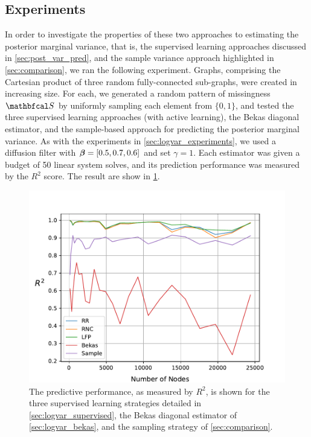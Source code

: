 \subsection{Experiments}

In order to investigate the properties of these two approaches to estimating the posterior marginal variance, that is, the supervised learning approaches discussed in \cref{sec:post_var_pred}, and the sample variance approach highlighted in \cref{sec:comparison}, we ran the following experiment. Graphs, comprising the Cartesian product of three random fully-connected sub-graphs, were created in increasing size. For each, we generated a random pattern of missingness $\St$ by uniformly sampling each element from $\{0, 1\}$, and tested the three supervised learning approaches (with active learning), the Bekas diagonal estimator, and the sample-based approach for predicting the posterior marginal variance. As with the experiments in \cref{sec:logvar_experiments}, we used a diffusion filter with $\boldsymbol{\beta} = [0.5, 0.7, 0.6]$ and set $\gamma=1$. Each estimator was given a budget of 50 linear system solves, and its prediction performance was measured by the $R^2$ score. The result are show in \cref{fig:var_comparison}.


\begin{figure}[t] 
    \begin{center}
        \includegraphics[width=0.8\linewidth]{Figures/sample_diag_estimation.pdf}
    \end{center}
   \caption[Performance of the sampling strategy for predicting posterior marginal variance compared with the supervised learning strategies as a function of graph size]{The predictive performance, as measured by $R^2$, is shown for the three supervised learning strategies detailed in \cref{sec:logvar_supervised}, the Bekas diagonal estimator of \cref{sec:logvar_bekas}, and the sampling strategy of \cref{sec:comparison}. } 
    \label{fig:var_comparison}
\end{figure} 


